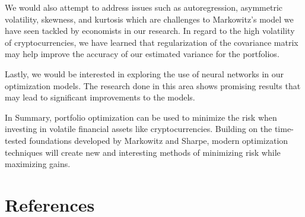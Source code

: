 \documentclass[11pt]{article} %
\begin{document}
We would also attempt to address issues such as autoregression, asymmetric volatility, skewness, and kurtosis which are challenges to Markowitz’s model we have seen tackled by economists in our research. In regard to the high volatility of cryptocurrencies, we have learned that regularization of the covariance matrix may help improve the accuracy of our estimated variance for the portfolios.

Lastly, we would be interested in exploring the use of neural networks in our optimization models. The research done in this area shows promising results that may lead to significant improvements to the models.

In Summary, portfolio optimization can be used to minimize the risk when investing in volatile financial assets like cryptocurrencies. Building on the time-tested foundations developed by Markowitz and Sharpe, modern optimization techniques will create new and interesting methods of minimizing risk while maximizing gains.

\pagebreak

\section*{References}
\end{document}
